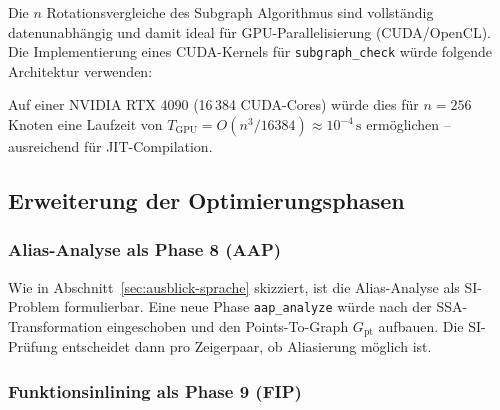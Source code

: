 ﻿\documentclass[a4paper,12pt]{article}
\theoremstyle{definition}
\begin{document}
Die $n$ Rotationsvergleiche des Subgraph Algorithmus sind vollständig
datenunabhängig und damit ideal für GPU-Parallelisierung (CUDA/OpenCL).
Die Implementierung eines CUDA-Kernels für \texttt{subgraph\_check}
würde folgende Architektur verwenden:

\begin{center}
\end{center}

Auf einer NVIDIA RTX 4090 (16\,384 CUDA-Cores) würde dies für $n = 256$
Knoten eine Laufzeit von
$T_{\mathrm{GPU}} = O(n^3 / 16384) \approx 10^{-4}\,\text{s}$
ermöglichen -- ausreichend für JIT-Compilation.

\subsection{Erweiterung der Optimierungsphasen}
\label{sec:ausblick-opt}

\subsubsection{Alias-Analyse als Phase 8 (AAP)}

Wie in Abschnitt~\ref{sec:ausblick-sprache} skizziert, ist die
Alias-Analyse als SI-Problem formulierbar. Eine neue Phase
\texttt{aap\_analyze} würde nach der SSA-Transformation eingeschoben
und den Points-To-Graph $G_{\mathrm{pt}}$ aufbauen. Die SI-Prüfung
entscheidet dann pro Zeigerpaar, ob Aliasierung möglich ist.

\subsubsection{Funktionsinlining als Phase 9 (FIP)}
\end{document}
